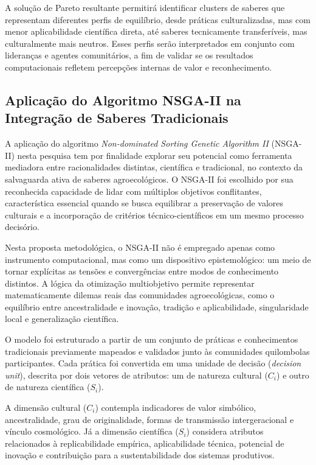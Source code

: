 A solução de Pareto resultante permitirá identificar clusters de saberes que representam diferentes perfis de equilíbrio, desde práticas culturalizadas, mas com menor aplicabilidade científica direta, até saberes tecnicamente transferíveis, mas culturalmente mais neutros. Esses perfis serão interpretados em conjunto com lideranças e agentes comunitários, a fim de validar se os resultados computacionais refletem percepções internas de valor e reconhecimento.


\subsection{Aplicação do Algoritmo NSGA-II na Integração de Saberes Tradicionais}

A aplicação do algoritmo \textit{Non-dominated Sorting Genetic Algorithm II} (NSGA-II) nesta pesquisa tem por finalidade explorar seu potencial como ferramenta mediadora entre racionalidades distintas, científica e tradicional, no contexto da salvaguarda ativa de saberes agroecológicos. O NSGA-II foi escolhido por sua reconhecida capacidade de lidar com múltiplos objetivos conflitantes, característica essencial quando se busca equilibrar a preservação de valores culturais e a incorporação de critérios técnico-científicos em um mesmo processo decisório.

Nesta proposta metodológica, o NSGA-II não é empregado apenas como instrumento computacional, mas como um dispositivo epistemológico: um meio de tornar explícitas as tensões e convergências entre modos de conhecimento distintos. A lógica da otimização multiobjetivo permite representar matematicamente dilemas reais das comunidades agroecológicas, como o equilíbrio entre ancestralidade e inovação, tradição e aplicabilidade, singularidade local e generalização científica.

O modelo foi estruturado a partir de um conjunto de práticas e conhecimentos tradicionais previamente mapeados e validados junto às comunidades quilombolas participantes. Cada prática foi convertida em uma unidade de decisão (\textit{decision unit}), descrita por dois vetores de atributos: um de natureza cultural ($C_i$) e outro de natureza científica ($S_i$). 

A dimensão cultural ($C_i$) contempla indicadores de valor simbólico, ancestralidade, grau de originalidade, formas de transmissão intergeracional e vínculo cosmológico. Já a dimensão científica ($S_i$) considera atributos relacionados à replicabilidade empírica, aplicabilidade técnica, potencial de inovação e contribuição para a sustentabilidade dos sistemas produtivos. 

